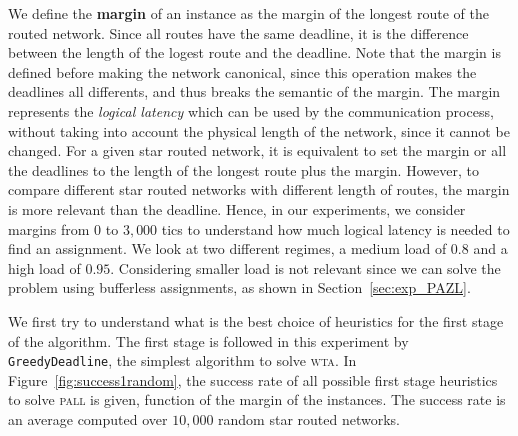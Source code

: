 \documentclass[a4paper,10pt]{journal}
\newcommand\greedydeadline{\texttt{GreedyDeadline}\xspace}
\newcommand\pall{\textsc{pall}\xspace}
\newcommand\wta{\textsc{wta}\xspace}
\begin{document}
    We define the {\bf margin} of an instance as the margin of the longest route of the routed network. Since all routes have the same deadline, it is the difference between the length of the logest route and the deadline. Note that the margin is defined before making the network canonical, since this operation makes the deadlines all differents, and thus breaks the semantic of the margin.
	The margin represents the \emph{logical latency} which can be used by the communication process, without taking into account the physical length of the network, since it cannot be changed. For a given star routed network, it is equivalent to set the margin or all the deadlines to the length of the longest route plus the margin. However, to compare different star routed networks with different length of routes, the margin is more relevant than the deadline. Hence, in our experiments, we consider margins from $0$ to $3,000$ tics to understand how much logical latency is needed to find an assignment. We look at two different regimes, a medium load of $0.8$ and a high load of $0.95$. Considering smaller load is not relevant since we can solve the problem using bufferless assignments, as shown in Section~\ref{sec:exp_PAZL}. 
   
   	We first try to understand what is the best choice of heuristics for the first stage of the algorithm. The first stage is followed in this experiment by \greedydeadline, the simplest algorithm to solve \wta. In Figure~\ref{fig:success1random}, the success rate of all possible first stage heuristics to solve \pall is given, function of the margin of the instances. The success rate is an average computed over $10,000$ random star routed networks. 
   
\end{document}

